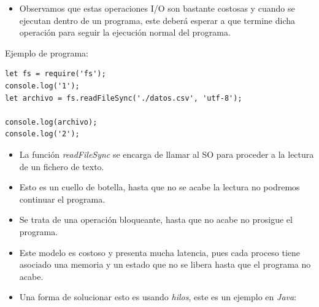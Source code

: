 \documentclass[4paper]{article}
\begin{document}
\begin{itemize}
\item Observamos que estas operaciones I/O son bastante costosas y cuando se ejecutan dentro de un programa, este deberá esperar a que termine dicha operación para seguir la ejecución normal del programa.
\end{itemize}
\newpage

Ejemplo de programa:
\begin{lstlisting}
let fs = require('fs');
console.log('1');
let archivo = fs.readFileSync('./datos.csv', 'utf-8');

console.log(archivo);
console.log('2');

\end{lstlisting}

\begin{itemize}
\item La función \emph{readFileSync} se encarga de llamar al SO para proceder a la lectura de un fichero de texto.
\item Esto es un cuello de botella, hasta que no se acabe la lectura no podremos continuar el programa.
\item Se trata de una operación bloqueante, hasta que no acabe no prosigue el programa.
\item Este modelo es costoso y presenta mucha latencia, pues cada proceso tiene asociado una memoria y un estado que no se libera hasta que el programa no acabe.
\item Una forma de solucionar esto es usando \emph{hilos}, este es un ejemplo en \emph{Java}:
\end{itemize}
\end{document}
